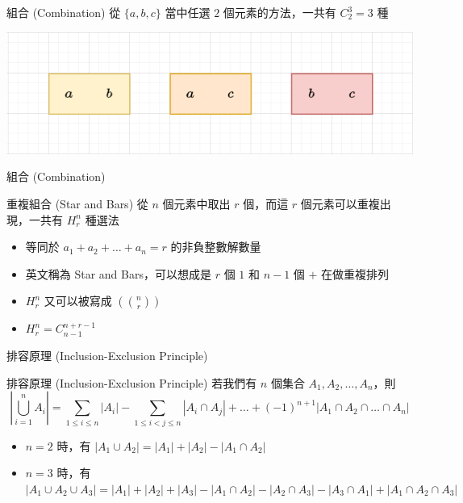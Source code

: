 \documentclass[aspectratio=169]{beamer}
\begin{document}
    \begin{frame}{組合 (Combination)}
        從 $\{a,b,c\}$ 當中任選 $2$ 個元素的方法，一共有 $C^3_2 = 3$ 種
        \begin{center}
            \includegraphics[width=\textwidth]{images/combination.png}
        \end{center}
    \end{frame}
    
    \begin{frame}{組合 (Combination)}
        \begin{alertblock}{重複組合 (Star and Bars)}
            從 $n$ 個元素中取出 $r$ 個，而這 $r$ 個元素可以重複出現，一共有 $H^n_r$ 種選法
            \begin{itemize}
                \item 等同於 $a_1+a_2+\dots+a_n = r$ 的非負整數解數量
                \item 英文稱為 Star and Bars，可以想成是 $r$ 個 $1$ 和 $n-1$ 個 $+$ 在做重複排列
                \item $H^n_r$ 又可以被寫成 $\displaystyle \left(\!\!{\binom {n}{r}}\!\!\right)$
                \item $H^n_r = C^{n+r-1}_{n-1}$ 
            \end{itemize}
        \end{alertblock}
    \end{frame}
    
    \begin{frame}{排容原理 (Inclusion-Exclusion Principle)}
        \begin{alertblock}{排容原理 (Inclusion-Exclusion Principle)}
            若我們有 $n$ 個集合 $A_1,A_2,\dots,A_n$，則
            $$\left|\bigcup^n_{i=1} A_i\right| = \sum_{1 \le i \le n} |A_i| - \sum_{1 \le i < j \le n} |A_i \cap A_j| + \dots + (-1)^{n+1} |A_1 \cap A_2 \cap \dots \cap A_n| $$
            \vspace{5mm}
            \begin{itemize}
                \item $n=2$ 時，有 $|A_1 \cup A_2| = |A_1| + |A_2| - |A_1 \cap A_2|$
                \item $n=3$ 時，有 $|A_1 \cup A_2 \cup A_3| = |A_1| + |A_2| + |A_3| - |A_1 \cap A_2| - |A_2 \cap A_3| - |A_3 \cap A_1| + |A_1 \cap A_2 \cap A_3|$
            \end{itemize}
        \end{alertblock}
    \end{frame}
    
\end{document}
